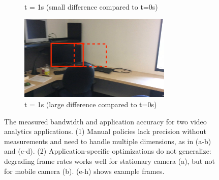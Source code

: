 \begin{figure}
\begin{subfigure}{0.5\textwidth}
    \caption{t = 1s (small difference compared to t=0s)}
  \end{subfigure}%
  \begin{subfigure}{0.5\textwidth}
    \centering
    \includegraphics[width=0.8\textwidth]{figures/darknet-2.jpg}
    \caption{t = 1s (large difference compared to t=0s)}
  \end{subfigure}

  \caption{The measured bandwidth and application accuracy for two video
    analytics applications. (1) Manual policies lack precision without
    measurements and need to handle multiple dimensions, as in (a-b) and
    (c-d). (2) Application-specific optimizations do not generalize: degrading
    frame rates works well for stationary camera (a), but not for mobile camera
    (b). (e-h) shows example frames.}
  \label{fig:app-specific}
\end{figure}

